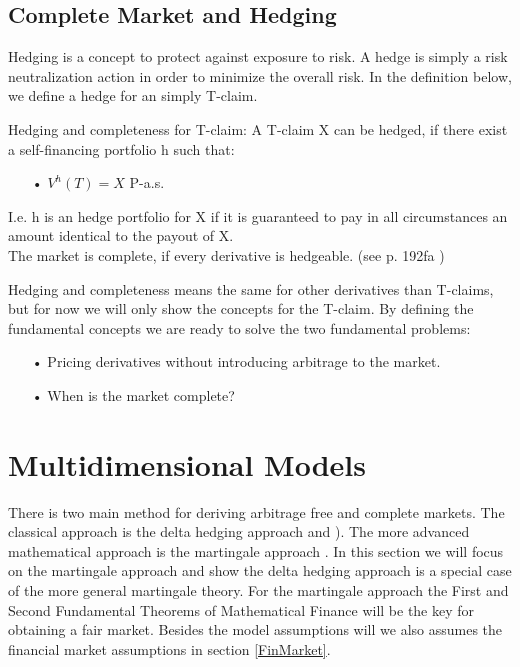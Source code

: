 
\subsection{Complete Market and Hedging}
Hedging is a concept to protect against exposure to risk. A hedge is simply a risk neutralization action in order to minimize the overall risk. In the definition below, we define a hedge for an simply T-claim.
\theoremstyle{definition}
\begin{definition}{Hedging and completeness for T-claim:}
A T-claim X can be hedged, if there exist a self-financing portfolio h such that:
\begin{enumerate}
\item[•] $V^{h}(T)=X$ P-a.s.
\end{enumerate}
I.e. h is an hedge portfolio for X if it is guaranteed to pay in all circumstances an amount identical to the payout of X.\\
The market is complete, if every derivative is hedgeable.
(see p. 192fa \parencite{finKont})
\end{definition}
Hedging and completeness means the same for other derivatives than T-claims, but for now we will only show the concepts for the T-claim. By defining the fundamental concepts we are ready to solve the two fundamental problems:
\begin{enumerate}
\item[•] Pricing derivatives without introducing arbitrage to the market.
\item[•] When is the market complete?
\end{enumerate}


\section{Multidimensional Models}\label{MultiDimModel}
There is two main method for deriving arbitrage free and complete markets. The classical approach is the delta hedging approach \parencite{B-S-Paper} and \parencite{CRR}). The more advanced mathematical approach is the martingale approach  \parencite{finKont}. In this section we will focus on the martingale approach and show the delta hedging approach is a special case of the more general martingale theory. For the martingale approach the First and Second Fundamental Theorems of Mathematical Finance will be the key for obtaining a fair market. Besides the model assumptions will we also assumes the financial market assumptions in section \ref{FinMarket}.

